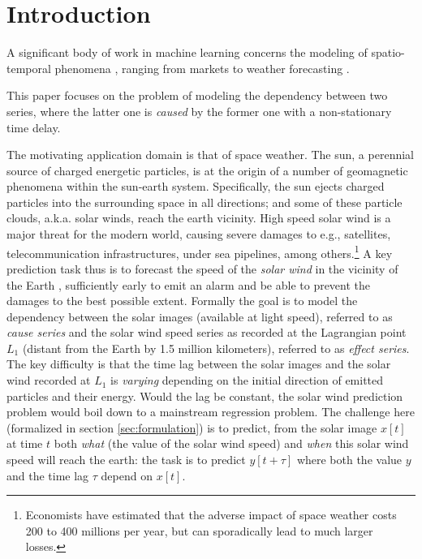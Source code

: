 \section{Introduction}
A significant body of work in machine learning concerns the modeling of spatio-temporal phenomena \cite{SurveyST}, 
ranging from markets \cite{Pedreschi} to weather forecasting \cite{Horvitz}.

This paper focuses on the problem of modeling the dependency between two series, 
where the latter one is {\em caused} by the former one \cite{Granger} with a non-stationary time delay. 

The motivating application domain is that of space weather.
The sun, a perennial source of charged energetic particles, is at the origin of a number of geomagnetic phenomena within the sun-earth system. 
Specifically, the sun ejects charged particles into the surrounding space in all directions; and some of these particle clouds, a.k.a. solar winds, reach the earth vicinity. High speed solar wind is a major threat for the modern world, causing severe damages to e.g., satellites, telecommunication infrastructures, under sea pipelines, among others.\footnote{Economists have estimated that the adverse impact of space weather costs 200 to 400 millions per year, but can sporadically lead to much larger losses.} 
A key prediction task thus is to forecast the speed of the \emph{solar wind} in 
the vicinity of the Earth \cite{doi:10.1002/jgra.50429,doi:10.1029/2009SW000542}, sufficiently early to emit an alarm and be able to prevent the damages to the best possible extent.
Formally the goal is to model the dependency between the solar images (available at light speed), referred to as {\em cause series} 
and the solar wind speed series as recorded at the Lagrangian point $L_1$ (distant from the Earth by 1.5 million kilometers), referred to as {\em effect series}. 
The key difficulty is that the time lag between the solar images and the solar wind recorded at $L_1$ is {\em varying} depending on the initial direction of emitted particles and their energy. Would the lag be constant, the solar wind prediction problem would boil down to a mainstream regression problem. The challenge here (formalized in section \ref{sec:formulation})
is to predict, from the solar image $x[t]$ at time $t$ both {\em what} (the value of the solar wind speed) and {\em when} this solar wind speed will reach the earth: the task is to predict $y[t + \tau]$ where both the value $y$ and the time lag $\tau$ depend on $x[t]$. 


